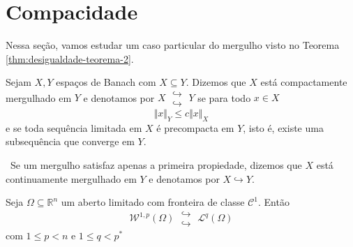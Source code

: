 \documentclass[a4paper, 11pt]{book}
\theoremstyle{definition}
\newcommand{\obs}{\noindent{\textbf{\textcolor{black}{\sffamily Observação:}}}~}
\newcommand{\bN}{\mathbb{N}}
\newcommand{\bR}{\mathbb{R}}
\newcommand{\cC}{\mathcal{C}}
\newcommand{\cL}{\mathcal{L}}
\newcommand{\cW}{\mathcal{W}}
\newcommand{\doublehookrightarrow}{\;\substack{\hookrightarrow \\ \hookrightarrow}\;}
\begin{document}
\section{Compacidade}

Nessa seção, vamos estudar um caso particular do mergulho visto no Teorema \ref{thm:desigualdade-teorema-2}.

\begin{dbox}
    Sejam $X, Y$ espaços de Banach com $X \subseteq Y$. Dizemos que $X$ está compactamente mergulhado em $Y$ e denotamos por $X \doublehookrightarrow Y$
    se para todo $x \in X$
    \[
        \Vert x \Vert_{Y} \leqslant c \Vert x \Vert_X
    \]
    e se toda sequência limitada em $X$ é precompacta em $Y$, isto é, existe uma subsequência que converge em $Y$.
\end{dbox}

\obs Se um mergulho satisfaz apenas a primeira propiedade, dizemos que $X$ está continuamente mergulhado em $Y$ e denotamos por $X \hookrightarrow Y$.

\begin{tbox}
    Seja $\Omega \subseteq \bR^n$ um aberto limitado com fronteira de classe $\cC^1$.
    Então
    \[
        \cW^{1,p}(\Omega) \doublehookrightarrow \cL^q(\Omega)
    \]
    com $1 \leqslant p < n$ e $1 \leqslant q < p^*$
\end{tbox}

\end{document}

